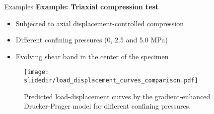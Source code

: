 
\begin{frame}{Examples}
    \textbf{Example: Triaxial compression test}
\begin{minipage}{1.0\textwidth}
\begin{minipage}{0.55\textwidth}
    \begin{itemize}
        \item Subjected to axial displacement-controlled compression
        \item Different confining pressures (0, 2.5 and 5.0 MPa)
        \item Evolving shear band in the center of the specimen
    \end{itemize}
\end{minipage}
\end{minipage}

\begin{minipage}{1.0\textwidth}
    \begin{figure}[htpb]
        \centering
        \texttt{[image: \\slidedir/load\_displacement\_curves\_comparison.pdf]}
        \caption{Predicted load-displacement curves by the gradient-enhanced Drucker-Prager model for different confining pressures.}%
    \end{figure}
\end{minipage}
\end{frame}
